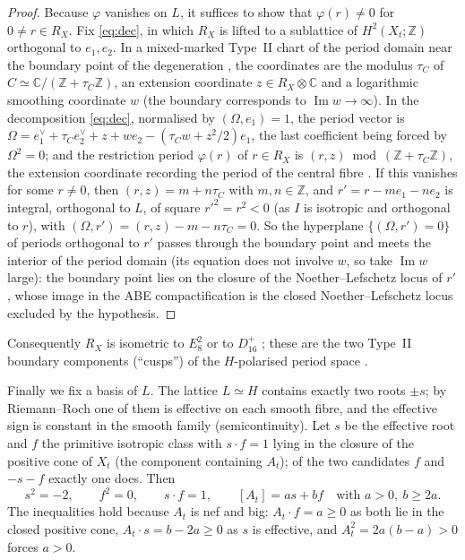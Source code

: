 \documentclass[11pt]{article}
\newcommand{\Z}{\mathbb Z}
\newcommand{\C}{\mathbb C}
\theoremstyle{definition}
\theoremstyle{remark}
\begin{document}
\begin{proof}
Because \(\varphi\) vanishes on \(L\), it suffices to show that
\(\varphi(r)\neq0\) for \(0\neq r\in R_X\). Fix \eqref{eq:dec}, in
which \(R_X\) is lifted to a sublattice of \(H^2(X_t;\Z)\) orthogonal
to \(e_1,e_2\).
In a mixed-marked Type~II chart of the period domain near the
boundary point of the degeneration \cite[Theorem~7.1]{AE}, the
coordinates are the modulus \(\tau_C\) of \(C\simeq\C/(\Z+\tau_C\Z)\),
an extension coordinate \(z\in R_X\otimes\C\) and a logarithmic
smoothing coordinate \(w\) (the boundary corresponds to
\(\operatorname{Im}w\to\infty\)). In the decomposition \eqref{eq:dec},
normalised by \((\Omega,e_1)=1\), the period vector is
\(\Omega=e_1^\vee+\tau_Ce_2^\vee+z+we_2-(\tau_Cw+z^2/2)e_1\), the last
coefficient being forced by \(\Omega^2=0\); and the restriction period
\(\varphi(r)\) of \(r\in R_X\) is \((r,z)\bmod(\Z+\tau_C\Z)\), the
extension coordinate recording the period of the central fibre
\cite[Construction~4.3, Proposition~4.13]{AE}.
If this vanishes for some \(r\neq0\), then \((r,z)=m+n\tau_C\) with
\(m,n\in\Z\), and \(r'=r-me_1-ne_2\) is integral, orthogonal to \(L\),
of square \(r'^2=r^2<0\) (as \(I\) is isotropic and orthogonal to
\(r\)), with \((\Omega,r')=(r,z)-m-n\tau_C=0\). So the hyperplane
\(\{(\Omega,r')=0\}\) of periods orthogonal to \(r'\) passes through
the boundary point and meets the interior of the period domain (its
equation does not involve \(w\), so take \(\operatorname{Im}w\)
large): the boundary point lies on the
closure of the Noether--Lefschetz locus of \(r'\), whose image in the
ABE compactification is the closed Noether--Lefschetz locus excluded
by the hypothesis.
\end{proof}

Consequently \(R_X\) is isometric to \(E_8^2\) or to \(D_{16}^+\)
\cite[\S8]{Se}; these are the two Type~II boundary components
(``cusps'') of the \(H\)-polarised period space
\cite[\S7F, Theorem~7.58]{ABE}.

Finally we fix a basis of \(L\). The lattice \(L\simeq H\) contains
exactly two roots \(\pm s\); by
Riemann--Roch one of them is effective on each smooth fibre, and the
effective sign is constant in the smooth family (semicontinuity). Let
\(s\) be the effective root and \(f\) the primitive isotropic class
with \(s\cdot f=1\) lying in the closure of the positive cone of
\(X_t\) (the component containing \(A_t\)); of the two candidates
\(f\) and \(-s-f\) exactly one does. Then
\begin{equation}\label{eq:ab}
 s^2=-2,\qquad f^2=0,\qquad s\cdot f=1,\qquad
 [A_t]=as+bf\quad\text{with } a>0,\ b\geq2a .
\end{equation}
The inequalities hold because \(A_t\) is nef and big:
\(A_t\cdot f=a\geq0\) as both lie in the closed positive cone,
\(A_t\cdot s=b-2a\geq0\) as \(s\) is effective, and
\(A_t^2=2a(b-a)>0\) forces \(a>0\).
\end{document}
